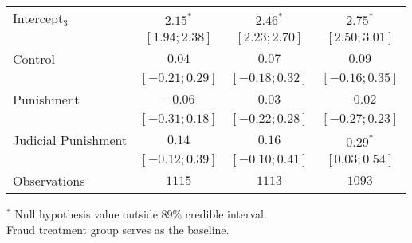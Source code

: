 \begin{table}[h]
\begin{center}
\begin{threeparttable}
\begin{tabular}{l c c c}
Intercept$_3$       & $2.15^{*}$        & $2.46^{*}$        & $2.75^{*}$        \\
                    & $ [ 1.94;  2.38]$ & $ [ 2.23;  2.70]$ & $ [ 2.50;  3.01]$ \\
Control             & $0.04$            & $0.07$            & $0.09$            \\
                    & $ [-0.21;  0.29]$ & $ [-0.18;  0.32]$ & $ [-0.16;  0.35]$ \\
Punishment          & $-0.06$           & $0.03$            & $-0.02$           \\
                    & $ [-0.31;  0.18]$ & $ [-0.22;  0.28]$ & $ [-0.27;  0.23]$ \\
Judicial Punishment & $0.14$            & $0.16$            & $0.29^{*}$        \\
                    & $ [-0.12;  0.39]$ & $ [-0.10;  0.41]$ & $ [ 0.03;  0.54]$ \\
\hline
Observations        & $1115$            & $1113$            & $1093$            \\
\hline
\end{tabular}
\begin{tablenotes}[flushleft]
\scriptsize{$^*$ Null hypothesis value outside 89\% credible interval.  \\
Fraud treatment group serves as the baseline.}
\end{tablenotes}
\end{threeparttable}
\label{table:coefficients}
\end{center}
\end{table}
